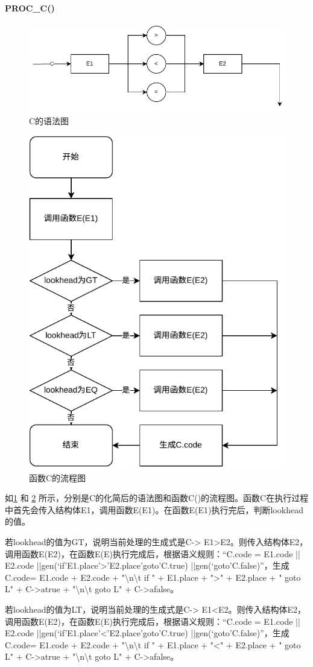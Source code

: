 \documentclass{ctexrep}
\begin{document}
\paragraph{PROC\_C()}
\begin{figure}
    \centering
    \includegraphics[width = .8\linewidth]{c.drawio.pdf}
    \caption{C的语法图}
    \label{fig:c}
\end{figure}
\begin{figure}
    \centering
    \includegraphics[width = .4\linewidth]{001C.drawio.png.pdf}
    \caption{函数C的流程图}
    \label{fig:proc-c}
\end{figure}

如\cref{fig:c} 和 \cref{fig:proc-c} 所示，分别是C的化简后的语法图和函数C()的流程图。函数C在执行过程中首先会传入结构体E1，调用函数E(E1)。在函数E(E1)执行完后，判断lookhead的值。

若lookhead的值为GT，说明当前处理的生成式是C-> E1>E2。则传入结构体E2，调用函数E(E2)，在函数E(E)执行完成后，根据语义规则：“C.code = E1.code || E2.code ||gen(‘if’E1.place’>’E2.place’goto’C.true) ||gen(‘goto’C.false)”，生成C.code= E1.code + E2.code + "\textbackslash{}n\textbackslash{}t if " + E1.place + ">" + E2.place + " goto L" + C->atrue + "\textbackslash{}n\textbackslash{}t goto L" + C->afalse。

若lookhead的值为LT，说明当前处理的生成式是C-> E1<E2。则传入结构体E2，调用函数E(E2)，在函数E(E)执行完成后，根据语义规则：“C.code = E1.code || E2.code ||gen(‘if’E1.place’<’E2.place’goto’C.true) ||gen(‘goto’C.false)”，生成C.code= E1.code + E2.code + "\textbackslash{}n\textbackslash{}t if " + E1.place + "<" + E2.place + " goto L" + C->atrue + "\textbackslash{}n\textbackslash{}t goto L" + C->afalse。
\end{document}
